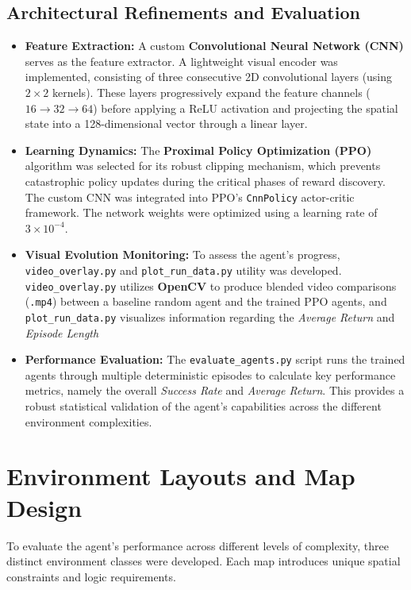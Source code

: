 \documentclass[12pt,a4paper]{article}
\begin{document}
\subsection{Architectural Refinements and Evaluation}
\begin{itemize}
    \item \textbf{Feature Extraction:} A custom \textbf{Convolutional Neural Network (CNN)} serves as the feature extractor. A lightweight visual encoder was implemented, consisting of three consecutive 2D convolutional layers (using $2 \times 2$ kernels). These layers progressively expand the feature channels ($16 \rightarrow 32 \rightarrow 64$) before applying a ReLU activation and projecting the spatial state into a 128-dimensional vector through a linear layer.

    \item \textbf{Learning Dynamics:} The \textbf{Proximal Policy Optimization (PPO)} algorithm was selected for its robust clipping mechanism, which prevents catastrophic policy updates during the critical phases of reward discovery. The custom CNN was integrated into PPO's \texttt{CnnPolicy} actor-critic framework. The network weights were optimized using a learning rate of $3 \times 10^{-4}$.

    \item \textbf{Visual Evolution Monitoring:} To assess the agent's progress, \newline \texttt{video\_overlay.py} and \texttt{plot\_run\_data.py} utility was developed. \newline \texttt{video\_overlay.py} utilizes \textbf{OpenCV} to produce blended video comparisons (\texttt{.mp4}) between a baseline random agent and the trained PPO agents, and \texttt{plot\_run\_data.py} visualizes information regarding the \textit{Average Return} and \textit{Episode Length}

    \item \textbf{Performance Evaluation:} The \texttt{evaluate\_agents.py} script runs the trained agents through multiple deterministic episodes to calculate key performance metrics, namely the overall \textit{Success Rate} and \textit{Average Return}. This provides a robust statistical validation of the agent's capabilities across the different environment complexities.
\end{itemize}

\section{Environment Layouts and Map Design}
To evaluate the agent's performance across different levels of complexity, three distinct environment classes were developed. Each map introduces unique spatial constraints and logic requirements.
\end{document}
